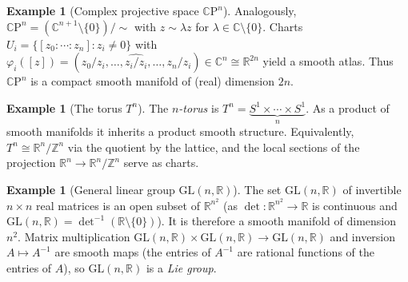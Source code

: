 \documentclass[12pt,a4paper,openany]{book}
\theoremstyle{definition}
\newtheorem{example}[theorem]{Example}
\theoremstyle{remark}
\newcommand{\Z}{\mathbb{Z}}
\newcommand{\R}{\mathbb{R}}
\newcommand{\C}{\mathbb{C}}
\newcommand{\CP}{\mathbb{C}\mathrm{P}}
\newcommand{\GL}{\mathrm{GL}}
\newcommand{\rel}{\sim}
\begin{document}
\begin{example}[Complex projective space $\CP^n$]\label{ex:CPn}
Analogously, $\CP^n = (\C^{n+1} \setminus \{0\})/{\rel}$ with
$z \rel \lambda z$ for $\lambda \in \C \setminus \{0\}$.  Charts
$U_i = \{[z_0:\cdots:z_n] : z_i \neq 0\}$ with
$\varphi_i([z]) = (z_0/z_i, \ldots, \widehat{z_i/z_i}, \ldots, z_n/z_i)
\in \C^n \cong \R^{2n}$ yield a smooth atlas.  Thus $\CP^n$ is a compact
smooth manifold of (real) dimension $2n$.
\end{example}

\begin{example}[The torus $T^n$]\label{ex:torus}
The \emph{$n$-torus} is $T^n = \underbrace{S^1 \times \cdots \times S^1}_{n}$.
As a product of smooth manifolds it inherits a product smooth structure.
Equivalently, $T^n \cong \R^n / \Z^n$ via the quotient by the lattice,
and the local sections of the projection $\R^n \to \R^n/\Z^n$ serve as
charts.
\end{example}


\begin{center}
\label{fig:torus}
\end{center}

\begin{example}[General linear group $\GL(n,\R)$]\label{ex:GLn}
\index{Lie group!$\GL(n,\R)$}
The set $\GL(n,\R)$ of invertible $n \times n$ real matrices is an open
subset of $\R^{n^2}$ (as $\det \colon \R^{n^2} \to \R$ is continuous and
$\GL(n,\R) = \det^{-1}(\R \setminus \{0\})$).  It is therefore a smooth
manifold of dimension $n^2$.  Matrix multiplication
$\GL(n,\R) \times \GL(n,\R) \to \GL(n,\R)$ and inversion
$A \mapsto A^{-1}$ are smooth maps (the entries of $A^{-1}$ are rational
functions of the entries of $A$), so $\GL(n,\R)$ is a
\emph{Lie group}.
\end{example}
\end{document}
